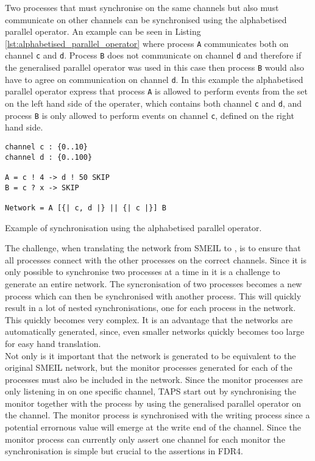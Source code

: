 Two processes that must synchronise on the same channels but also must communicate on other channels can be synchronised using the alphabetised parallel operator. An example can be seen in Listing \ref{lst:alphabetised_parallel_operator} where process \texttt{A} communicates both on channel \texttt{c} and \texttt{d}. Process \texttt{B} does not communicate on channel \texttt{d} and therefore if the generalised parallel operator was used in this case then process \texttt{B} would also have to agree on communication on channel \texttt{d}. In this example the alphabetised parallel operator express that process \texttt{A} is allowed to perform events from the set on the left hand side of the operater, which contains both channel \texttt{c} and \texttt{d}, and process \texttt{B} is only allowed to perform events on channel \texttt{c}, defined on the right hand side.
\begin{listing}
\begin{verbatim}
channel c : {0..10}
channel d : {0..100}

A = c ! 4 -> d ! 50 SKIP
B = c ? x -> SKIP

Network = A [{| c, d |} || {| c |}] B
\end{verbatim}
\caption{Example of synchronisation using the alphabetised parallel operator.}
\label{lst:alphabetised_parallel_operator}
\end{listing}


The challenge, when translating the network from SMEIL to \cspm{}, is to ensure that all processes connect with the other processes on the correct channels.
Since it is only possible to synchronise two processes at a time in \cspm{} it is a challenge to generate an entire network. The syncronisation of two processes becomes a new process which can then be synchronised with another process. This will quickly result in a lot of nested synchronisations, one for each process in the network. This quickly becomes very complex. It is an advantage that the \cspm{} networks are automatically generated, since, even smaller networks quickly becomes too large for easy hand translation.\\

Not only is it important that the network is generated to be equivalent to the original SMEIL network, but the monitor processes generated for each of the \cspm{} processes must also be included in the network. Since the monitor processes are only listening in on one specific channel, TAPS start out by synchronising the monitor together with the process by using the generalised parallel operator on the channel. The monitor process is synchronised with the writing process since a potential errornous value will emerge at the write end of the channel. Since the monitor process can currently only assert one channel for each monitor the synchronisation is simple but crucial to the assertions in FDR4.\\

